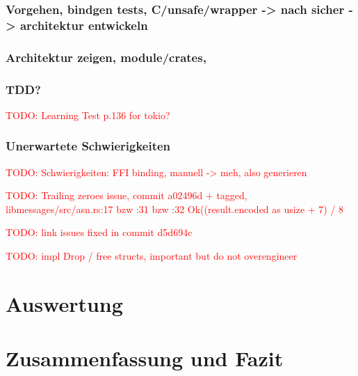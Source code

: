 \documentclass[
	12pt,
	table,
	bigheadings,
	ngerman,
	a4paper,
	BCOR5mm,
	DIV14,
	1.1headlines,
	pagesize,
	oneside,
	openright,
	titlepage,
	headsepline,
	nochapterprefix,
	bibtotoc,
	tocindent,
	listsindent,
	pointlessnumbers,
	cleardoubleempty,
	fleqn,
	halfparskip
]{scrbook}
\newcommand{\todo}[1]{\textcolor{red}{TODO: #1}}
\begin{document}
		\subsection{Vorgehen, bindgen tests, C/unsafe/wrapper -> nach sicher ->  architektur entwickeln}
		
		\subsection{Architektur zeigen, module/crates, }
	
		\subsection{TDD?}
		\todo{Learning Test p.136 for tokio?}
		\subsection{Unerwartete Schwierigkeiten}
		\label{impl:issue:ffi}
		\todo{Schwierigkeiten: FFI binding, manuell -> meh, also generieren}
			
		\todo{Trailing zeroes issue, commit a02496d + tagged, libmessages/src/asn.rs:17 bzw :31 bzw :32 Ok((result.encoded as usize + 7) / 8}
		
		\todo{link issues fixed in commit d5d694c}
		
		\todo{impl Drop / free structs, important but do not overengineer}
			
			
	\chapter{Auswertung}
	
	\chapter{Zusammenfassung und Fazit}
	
	
	
	
	\clearpage
	\normalem
	\printbibliography
	
	\clearpage
	\printglossary[type=\acronymtype]

	\clearpage
	\listoffigures
	\lstlistoflistings
	
	
\end{document}
